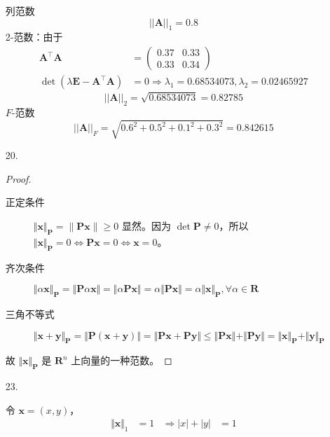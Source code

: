 \documentclass{sjtuarticle}
\begin{document}
\begin{itemize}
\begin{solution}
        列范数
        \begin{equation*}
            ||\bm{A}||_1=0.8
        \end{equation*}
        2-范数：由于
        \begin{align*}
            \bm{A}^\top\bm{A}&=\begin{pmatrix}
                0.37 & 0.33 \\
                0.33 & 0.34
            \end{pmatrix}\\
            \det(\lambda\bm{E}-\bm{A}^\top\bm{A})&=0\Rightarrow \lambda_{1} = 0.68534073, \lambda_2 = 0.02465927
        \end{align*}
        \begin{equation*}
            ||\bm{A}||_2=\sqrt{0.68534073}=0.82785
        \end{equation*}
        $F$-范数
        \begin{equation*}
            ||\bm{A}||_F=\sqrt{0.6^2+0.5^2+0.1^2+0.3^2}=0.842615
        \end{equation*}
    \end{solution}
    \item[20.]\begin{proof}
        \begin{description}
            \item[正定条件] $\Vert\bm{x}\Vert_{\bm{P}}=\lVert\bm{P}\bm{x}\rVert\geq 0$ 显然。因为 $\det\bm{P}\neq0$，所以$\Vert\bm{x}\Vert_{\bm{P}}=0\Leftrightarrow \bm{P}\bm{x}=0\Leftrightarrow \bm{x}=0$。
            \item[齐次条件] $\Vert \alpha\bm{x}\Vert_{\bm{P}}=\Vert \bm{P}\alpha\bm{x}\Vert=\Vert \alpha\bm{P}\bm{x}\Vert=\alpha\Vert \bm{P}\bm{x}\Vert=\alpha\Vert\bm{x}\Vert_{\bm{P}},\forall \alpha\in \mathbf{R}$
            \item[三角不等式]  $\Vert \bm{x}+\bm{y}\Vert_{\bm{P}}=\Vert\bm{P}(\bm{x}+\bm{y})\Vert=\Vert\bm{P}\bm{x}+\bm{P}\bm{y}\Vert\leq \Vert\bm{P}\bm{x}\Vert+\Vert\bm{P}\bm{y}\Vert=\Vert\bm{x}\Vert_{\bm{P}}+\Vert\bm{y}\Vert_{\bm{P}}$
        \end{description}
        故 $\Vert\bm{x}\Vert_{\bm{P}}$ 是 $\mathbf{R}^n$ 上向量的一种范数。
    \end{proof}
    \item[23.]\begin{solution}
        令 $\bm{x}=(x,y)$，
        \begin{align*}
            \Vert \bm{x}\Vert_1 &= 1 &\Rightarrow |x|+|y|&=1\\

\end{align*}
\end{solution}
\end{itemize}
\end{document}
